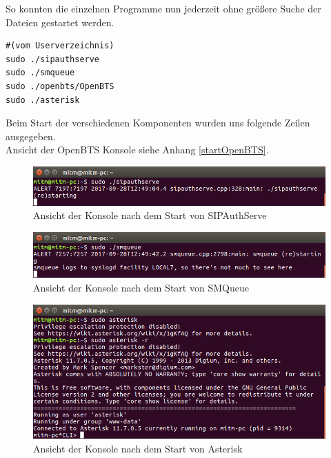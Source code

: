 So konnten die einzelnen Programme nun jederzeit ohne größere Suche der Dateien gestartet werden.
\begin{lstlisting}
#(vom Userverzeichnis)
sudo ./sipauthserve
sudo ./smqueue
sudo ./openbts/OpenBTS
sudo ./asterisk
\end{lstlisting}

Beim Start der verschiedenen Komponenten wurden uns folgende Zeilen ausgegeben.\\

Ansicht der OpenBTS Konsole siehe Anhang \ref{startOpenBTS}.
\begin{figure}[htbp]
	\centering
		\includegraphics[width=1.00\textwidth]{includes/Start_sipauthserve}
	\caption{Ansicht der Konsole nach dem Start von SIPAuthServe}
	\label{fig:start_sipauthserve}
\end{figure}

\begin{figure}[htbp]
	\centering
		\includegraphics[width=1.00\textwidth]{includes/Start_smqueue}
	\caption{Ansicht der Konsole nach dem Start von SMQueue}
	\label{fig:start_smqueue}
\end{figure}

\begin{figure}[htbp]
	\centering
		\includegraphics[width=1.00\textwidth]{includes/Start_asterisk}
	\caption{Ansicht der Konsole nach dem Start von Asterisk}
	\label{fig:start_asterisk}
\end{figure}

